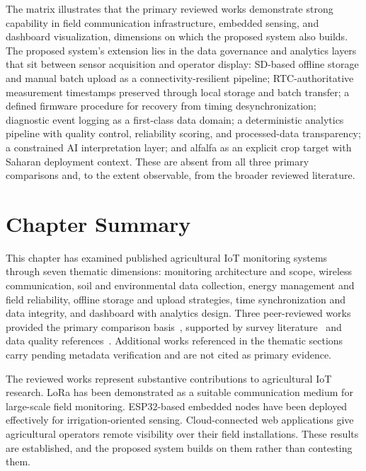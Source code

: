The matrix illustrates that the primary reviewed works demonstrate strong
capability in field communication infrastructure, embedded sensing, and
dashboard visualization, dimensions on which the proposed system also builds.
The proposed system's extension lies in the data governance and analytics layers
that sit between sensor acquisition and operator display: SD-based offline
storage and manual batch upload as a connectivity-resilient pipeline;
RTC-authoritative measurement timestamps preserved through local storage and
batch transfer; a defined firmware procedure for recovery from timing
desynchronization; diagnostic event logging as a first-class data domain;
a deterministic analytics pipeline with quality control, reliability scoring,
and processed-data transparency; a constrained AI interpretation layer; and
alfalfa as an explicit crop target with Saharan deployment context. These are
absent from all three primary comparisons and, to the extent observable, from
the broader reviewed literature.

\section{Chapter Summary}
\label{sec:ch2-summary}

This chapter has examined published agricultural IoT monitoring systems
through seven thematic dimensions: monitoring architecture and scope, wireless
communication, soil and environmental data collection, energy management and
field reliability, offline storage and upload strategies, time synchronization
and data integrity, and dashboard with analytics design. Three peer-reviewed
works provided the primary comparison
basis~\cite{ahmed2022lora_agriculture_chile,pereira2023esp32_drip_irrigation,saban2023smart_agricultural_lora_cloud},
supported by survey
literature~\cite{ayaz2019iot_smart_agriculture_survey,farooq2019iot_smart_agriculture_review}
and data quality
references~\cite{teh2020sensor_data_quality,dandrifosse2024weather_qc_agriculture}.
Additional works referenced in the thematic sections carry pending metadata
verification and are not cited as primary evidence.

The reviewed works represent substantive contributions to agricultural IoT
research. LoRa has been demonstrated as a suitable communication medium for
large-scale field monitoring. ESP32-based embedded nodes have been deployed
effectively for irrigation-oriented sensing. Cloud-connected web applications
give agricultural operators remote visibility over their field installations.
These results are established, and the proposed system builds on them rather
than contesting them.

